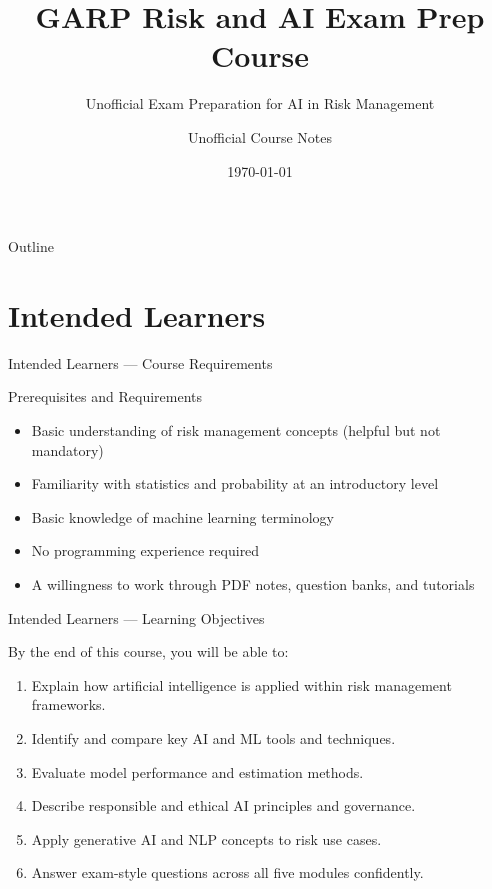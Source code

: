 \documentclass[aspectratio=169,11pt]{beamer}
\title[GARP Risk \& AI]{GARP Risk and AI Exam Prep Course}
\subtitle{Unofficial Exam Preparation for AI in Risk Management}
\author[Unofficial]{Unofficial Course Notes}
\institute[GARP Risk \& AI]{6 hours of video content \\ + PDF notes, question banks, and tutorials}
\date{\today}
\begin{document}
	
	\begin{frame}
		\titlepage
	\end{frame}
	
	\begin{frame}{Outline}
		\tableofcontents
	\end{frame}
	
	\section{Intended Learners}
	
	\begin{frame}{Intended Learners --- Course Requirements}
		\begin{block}{Prerequisites and Requirements}
			\begin{itemize}
				\item Basic understanding of risk management concepts (helpful but not mandatory)
				\item Familiarity with statistics and probability at an introductory level
				\item Basic knowledge of machine learning terminology
				\item No programming experience required
				\item A willingness to work through PDF notes, question banks, and tutorials
			\end{itemize}
		\end{block}
	\end{frame}
	
	\begin{frame}{Intended Learners --- Learning Objectives}
		\begin{block}{By the end of this course, you will be able to:}
			\begin{enumerate}
				\item Explain how artificial intelligence is applied within risk management frameworks.
				\item Identify and compare key AI and ML tools and techniques.
				\item Evaluate model performance and estimation methods.
				\item Describe responsible and ethical AI principles and governance.
				\item Apply generative AI and NLP concepts to risk use cases.
				\item Answer exam-style questions across all five modules confidently.
			\end{enumerate}
		\end{block}
	\end{frame}
	
\end{document}
